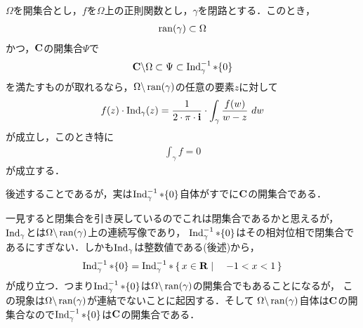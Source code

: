 	\begin{screen}
		\begin{thm}[Cauchyの積分定理]
			$\Omega$を開集合とし，$f$を$\Omega$上の正則関数とし，$\gamma$を閉路とする．このとき，
			\begin{align}
				\operatorname*{ran} (\gamma) \subset \Omega
			\end{align}
			かつ，$\mathbf{C}$の開集合$\Psi$で
			\begin{align}
				\mathbf{C} \backslash \Omega \subset \Psi \subset \operatorname{Ind}_{\gamma}^{-1} \ast \{0\}
			\end{align}
			を満たすものが取れるなら，$\Omega \backslash \operatorname*{ran} (\gamma)$の任意の要素$z$に対して
			\begin{align}
				f(z) \cdot \operatorname{Ind}_{\gamma}(z) = \frac{1}{2\cdot\pi\cdot\mathbf{i}} \cdot \int_{\gamma} \frac{f(w)}{w - z}\ dw
			\end{align}
			が成立し，このとき特に
			\begin{align}
				\int_\gamma f = 0
			\end{align}
			が成立する．
		\end{thm}
	\end{screen}
	
	後述することであるが，実は$\operatorname{Ind}_{\gamma}^{-1} \ast \{0\}$自体がすでに$\mathbf{C}$の開集合である．
	
	{\footnotesize 一見すると閉集合を引き戻しているのでこれは閉集合であるかと思えるが，
	$\operatorname{Ind}_{\gamma}$とは$\Omega \backslash \operatorname*{ran} (\gamma)$上の連続写像であり，
	$\operatorname{Ind}_{\gamma}^{-1} \ast \{0\}$はその相対位相で閉集合であるにすぎない．しかも$\operatorname{Ind}_{\gamma}$は整数値である(後述)から，
	\begin{align}
		\operatorname{Ind}_{\gamma}^{-1} \ast \{0\} = \operatorname{Ind}_{\gamma}^{-1} \ast \left\{\, x \in \mathbf{R} \mid \quad -1 < x < 1\, \right\}
	\end{align}
	が成り立つ．つまり$\operatorname{Ind}_{\gamma}^{-1} \ast \{0\}$は$\Omega \backslash \operatorname*{ran} (\gamma)$の開集合でもあることになるが，
	この現象は$\Omega \backslash \operatorname*{ran} (\gamma)$が連結でないことに起因する．そして
	$\Omega \backslash \operatorname*{ran} (\gamma)$自体は$\mathbf{C}$の開集合なので$\operatorname{Ind}_{\gamma}^{-1} \ast \{0\}$は$\mathbf{C}$の開集合である．}
	
